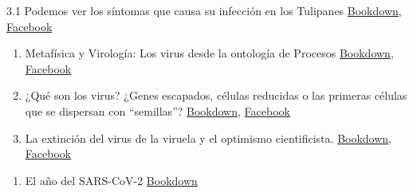 \documentclass[
  12pt, krantz2,
  spanish,
]{krantz}
\providecommand{\tightlist}{%
  \setlength{\itemsep}{0pt}\setlength{\parskip}{0pt}}
\begin{document}
3.1 Podemos ver los síntomas que causa su infección en los Tulipanes \protect\hyperlink{tulipomania}{Bookdown}, \href{https://www.facebook.com/permalink.php?story_fbid=116167563441400\&id=107088044349352}{Facebook}

\begin{enumerate}
\def\labelenumi{\arabic{enumi}.}
\setcounter{enumi}{3}
\item
  Metafísica y Virología: Los virus desde la ontología de Procesos \protect\hyperlink{metafisica}{Bookdown}, \href{https://www.facebook.com/permalink.php?story_fbid=137306747994148\&id=107088044349352}{Facebook}
\item
  ¿Qué son los virus? ¿Genes escapados, células reducidas o las primeras células que se dispersan con ``semillas''? \protect\hyperlink{WhatVirusAre}{Bookdown}, \href{https://www.facebook.com/permalink.php?story_fbid=145223737202449\&id=107088044349352}{Facebook}
\item
  La extinción del virus de la viruela y el optimismo cientificista. \protect\hyperlink{viruela}{Bookdown}, \href{https://www.facebook.com/permalink.php?story_fbid=148436860214470\&id=107088044349352}{Facebook}
\end{enumerate}

\begin{enumerate}
\def\labelenumi{\arabic{enumi}.}
\setcounter{enumi}{6}
\tightlist
\item
  El año del SARS-CoV-2 \protect\hyperlink{sarscov2}{Bookdown}
\end{enumerate}
\end{document}
